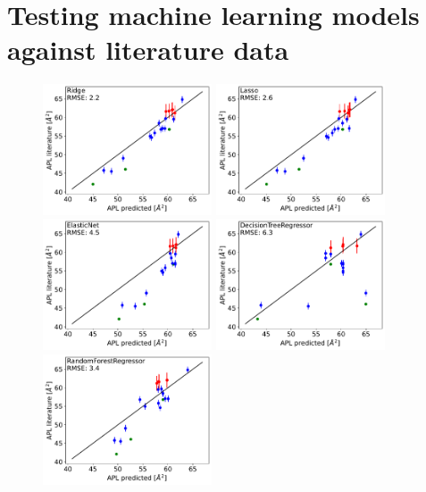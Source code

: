 \documentclass[fleqn,10pt]{wlscirepSI}
\begin{document}
\section{Testing machine learning models against literature data}
\begin{figure}[hb]
    \centering
    \includegraphics[width=50mm]{Figures/MLtest/Ridgetest.pdf}
    \includegraphics[width=50mm]{Figures/MLtest/Lassotest.pdf}
    \includegraphics[width=50mm]{Figures/MLtest/ElasticNettest.pdf}
    \includegraphics[width=50mm]{Figures/MLtest/DecisionTreeRegressortest.pdf}
    \includegraphics[width=50mm]{Figures/MLtest/RandomForestRegressortest.pdf}

\end{figure}
\end{document}
